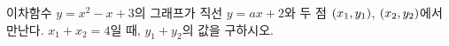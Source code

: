 이차함수 $y=x^2-x+3$의 그래프가 직선 $y=ax+2$와 두 점 $(x_1{,}\mkern3mu\mathopen{}y_1)$, $(x_2{,}\mkern3mu\mathopen{}y_2)$에서 만난다. $x_1+x_2=4$일 때, $y_1+y_2$의 값을 구하시오. 
